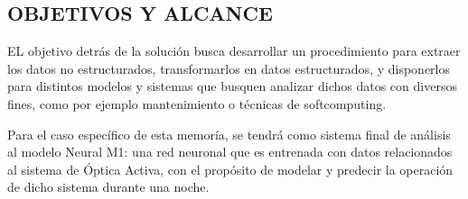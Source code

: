 \subsection{OBJETIVOS Y ALCANCE}

EL objetivo detrás de la solución busca desarrollar un procedimiento para extraer los datos no estructurados, transformarlos en datos estructurados, y disponerlos para distintos modelos y sistemas
que busquen analizar dichos datos con diversos fines, como por ejemplo mantenimiento o técnicas de softcomputing.

Para el caso específico de esta memoría, se tendrá como sistema final de análisis al modelo Neural M1: una red neuronal que es entrenada con datos relacionados al sistema de Óptica Activa, con el propósito de modelar y predecir la operación de dicho sistema durante una noche.
